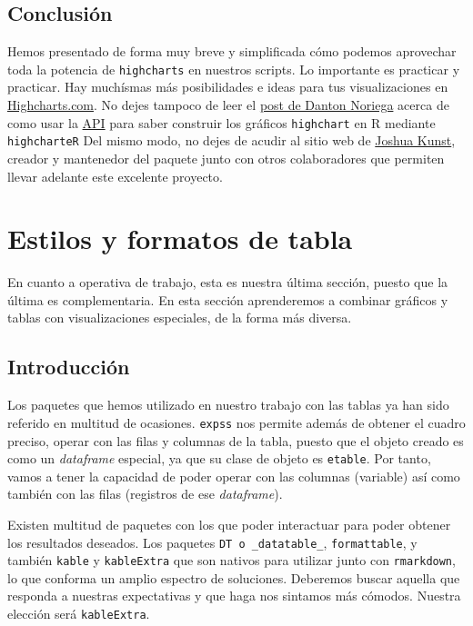 \documentclass[
]{book}
\begin{document}
\hypertarget{conclusiuxf3n-2}{%
\section{Conclusión}\label{conclusiuxf3n-2}}

Hemos presentado de forma muy breve y simplificada cómo podemos aprovechar toda la potencia de \texttt{highcharts} en nuestros scripts. Lo importante es practicar y practicar. Hay muchísmas más posibilidades e ideas para tus visualizaciones en \href{https://highcharts.com/demo}{Highcharts.com}. No dejes tampoco de leer el \href{https://dantonnoriega.github.io/ultinomics.org/posts/2017-04-05-highcharter-explainer.html}{post de Danton Noriega} acerca de como usar la \href{https://api.highcharts.com}{API} para saber construir los gráficos \texttt{highchart} en R mediante \texttt{highcharteR} Del mismo modo, no dejes de acudir al sitio web de \href{https://jkunst.com/highcharter}{Joshua Kunst}, creador y mantenedor del paquete junto con otros colaboradores que permiten llevar adelante este excelente proyecto.

\hypertarget{tse-formateo}{%
\chapter{Estilos y formatos de tabla}\label{tse-formateo}}

En cuanto a operativa de trabajo, esta es nuestra última sección, puesto que la última es complementaria. En esta sección aprenderemos a combinar gráficos y tablas con visualizaciones especiales, de la forma más diversa.

\hypertarget{introducciuxf3n}{%
\section{Introducción}\label{introducciuxf3n}}

Los paquetes que hemos utilizado en nuestro trabajo con las tablas ya han sido referido en multitud de ocasiones. \texttt{expss} nos permite además de obtener el cuadro preciso, operar con las filas y columnas de la tabla, puesto que el objeto creado es como un \emph{dataframe} especial, ya que su clase de objeto es \texttt{etable}. Por tanto, vamos a tener la capacidad de poder operar con las columnas (variable) así como también con las filas (registros de ese \emph{dataframe}).

Existen multitud de paquetes con los que poder interactuar para poder obtener los resultados deseados. Los paquetes \texttt{DT\ o\ \_datatable\_}, \texttt{formattable}, y también \texttt{kable} y \texttt{kableExtra} que son nativos para utilizar junto con \texttt{rmarkdown}, lo que conforma un amplio espectro de soluciones. Deberemos buscar aquella que responda a nuestras expectativas y que haga nos sintamos más cómodos. Nuestra elección será \texttt{kableExtra}.
\end{document}
